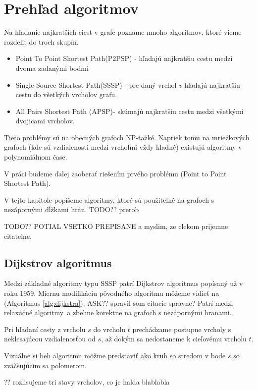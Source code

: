 \chapter{Prehľad algoritmov}
Na hľadanie najkratších ciest v grafe poznáme mnoho algoritmov, ktoré vieme rozdeliť do troch skupín.


\begin{itemize}
\item Point To Point Shortest Path(P2PSP) - hľadajú najkratšiu cestu medzi dvoma zadanými bodmi
\item Single Source Shortest Path(SSSP) - pre daný vrchol {\sl v} hľadajú najkratšiu cestu do všetkých vrcholov grafu.
\item All Pairs Shortest Path (APSP)- skúmajú najkratšiu cestu medzi všetkými dvojicami vrcholov.
\end{itemize}

Tieto problémy sú na obecných grafoch NP-ťažké.
Napriek tomu na mriežkových grafoch (kde sú vzdialenosti medzi vrcholmi vždy kladné) existujú algoritmy v polynomiálnom čase.

V práci budeme ďalej zaoberať riešením prvého problému (Point to Point Shortest Path). 

V tejto kapitole popíšeme algoritmy, ktoré sú použiteľné na grafoch s nezápornými dĺžkami hrán. TODO?? prerob

TODO?? POTIAL VSETKO PREPISANE a myslim, ze clekom prijemne citatelne.

\section{Dijkstrov algoritmus}
Medzi základné algoritmy typu SSSP patrí Dijkstrov algoritmus \cite{dijkstra59} popísaný už v roku 1959. 
Miernu modifikáciu pôvodného algoritmu môžeme vidieť na (Algoritmus \ref{alg:dijkstra}).  ASK?? spravil som citacie spravne?
Patrí medzi relaxačné algoritmy~a zbehne korektne na grafoch
s nezápornými hranami.

Pri hľadaní cesty z vrcholu $s$ do vrcholu $t$ prechádzame postupne vrcholy s neklesajúcou vzdialenosťou od $s$, až dokým sa nedostaneme k cieľovému vrcholu $t$.



Vizuálne si beh algoritmu môžme predstaviť ako kruh so stredom v bode $s$ so zväčšujúcim sa polomerom.

?? rozlisujeme tri stavy vrcholov, co je halda blablabla

